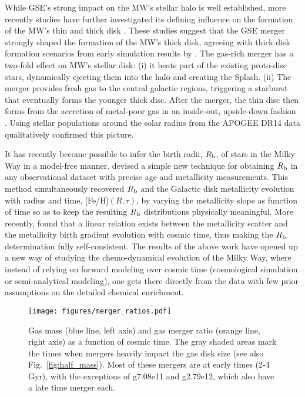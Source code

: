 \documentclass[useAMS,usenatbib]{mnras}
\begin{document}
While GSE's strong impact on the MW's stellar halo is well established, more recently studies have further investigated its defining influence on the formation of the MW's thin and thick disk \citep[e.g.][]{Grand2020,Ciuca2022,Orkney2022,Rey2023}. These studies suggest that the GSE merger strongly shaped the formation of the MW's thick disk, agreeing with thick disk formation scenarios from early simulation results by \cite{Brook2004, Brook2006}. The gas-rich merger has a two-fold effect on MW's stellar disk: (i) it heats part of the existing proto-disc stars, dynamically ejecting them into the halo and creating the Splash. (ii) The merger provides fresh gas to the central galactic regions, triggering a starburst \citep[potentially after first causing a pause in star formation;][]{Vincenzo2019} that eventually forms the younger thick disc. After the merger, the thin disc then forms from the accretion of metal-poor gas in an inside-out, upside-down fashion \citep[e.g.,][]{Bird2013, Minchev2013, Grand2018, Buck2020a}. Using stellar populations around the solar radius from the APOGEE DR14 data \citet{Ciuca2021} qualitatively confirmed this picture. 

It has recently become possible to infer the birth radii, $R_{\rm{b}}$, of stars in the Milky Way in a model-free manner. \cite{Minchev2018} devised a simple new technique for obtaining $R_{\rm{b}}$ in any observational dataset with precise age and metallicity measurements. This method simultaneously recovered $R_{\rm{b}}$ and the Galactic disk metallicity evolution with radius and time, [Fe/H]$(R,\tau)$, by varying the metallicity slope as function of time so as to keep the resulting $R_{\rm{b}}$ distributions physically meaningful. More recently, \cite{Lu2022b} found that a linear relation exists between the metallicity scatter and the metallicity birth gradient evolution with cosmic time, thus making the $R_{\rm{b}}$ determination fully self-consistent. The results of the above work have opened up a new way of studying the chemo-dynamical evolution of the Milky Way, where instead of relying on forward modeling over cosmic time (cosmological simulation or semi-analytical modeling), one gets there directly from the data with few prior assumptions on the detailed chemical enrichment.

\begin{figure*}
    \begin{centering}
        \texttt{[image: figures/merger\_ratios.pdf]}
        \vspace*{-1.75em}
        \caption{Gas mass (blue line, left axis) and gas merger ratio (orange line, right axis) as a function of cosmic time. The gray shaded areas mark the times when mergers heavily impact the gas disk size (see also Fig.~\ref{fig:half_mass}). Most of these mergers are at early times (2-4 Gyr), with the exceptions of g7.08e11 and g2.79e12, which also have a late time merger each.}
        \label{fig:merger_ratio}
    \end{centering}
\end{figure*}
\end{document}
